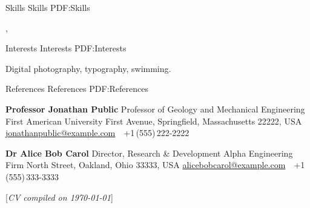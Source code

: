 \documentclass[letterpaper,MMMyyyy,nonstopmode]{simpleresumecv}
\newcommand{\CVNote}{CV compiled on {\today}}
\begin{document}
\begin{Body}

\Section
{Skills}
{Skills}
{PDF:Skills}

\Entry
{}
,



\Section
{Interests}
{Interests}
{PDF:Interests}

\Entry
Digital photography,
typography,
swimming.


\Section
{References}
{References}
{PDF:References}

\BulletItem
\textbf{Professor Jonathan Public}
\newline
Professor of Geology and Mechanical Engineering
\newline
First American University
 First Avenue, Springfield, Massachusetts 22222, USA
\newline
\href{mailto:jonathanpublic@example.com}
{jonathanpublic@example.com}
\,\SubBulletSymbol\,
+1\,(555)\,222-2222

\BigGap
\BulletItem
\textbf{Dr Alice Bob Carol}
\newline
Director, Research \& Development
\newline
Alpha Engineering Firm
 North Street, Oakland, Ohio 33333, USA
\newline
\href{mailto:alicebobcarol@example.com}
{alicebobcarol@example.com}
\,\SubBulletSymbol\,
+1\,(555)\,333-3333



\end{Body}


\UseNoteFont%
\null\hfill%
[\textit{\CVNote}]
\end{document}
